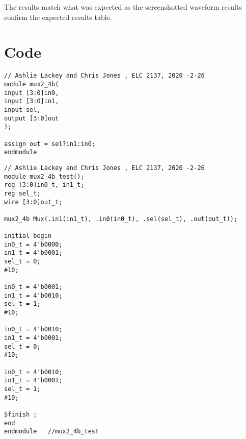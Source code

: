 \documentclass[11pt]{article}
\begin{document}
\clearpage

The results match what was expected as the screenshotted waveform results confirm the expected results table. 


\section*{Code}
\begin{lstlisting}[style=Verilog,caption=mux2-4b Code,label=code:ex ]
// Ashlie Lackey and Chris Jones , ELC 2137, 2020 -2-26
module mux2_4b(
input [3:0]in0,
input [3:0]in1,
input sel,
output [3:0]out
);

assign out = sel?in1:in0;
endmodule
\end{lstlisting}

\begin{lstlisting}[style=Verilog,caption=MUX Testbench Code,label=code:ex ]
// Ashlie Lackey and Chris Jones , ELC 2137, 2020 -2-26
module mux2_4b_test();
reg [3:0]in0_t, in1_t;
reg sel_t;
wire [3:0]out_t;

mux2_4b Mux(.in1(in1_t), .in0(in0_t), .sel(sel_t), .out(out_t));

initial begin
in0_t = 4'b0000;
in1_t = 4'b0001;
sel_t = 0;
#10;

in0_t = 4'b0001;
in1_t = 4'b0010;
sel_t = 1;
#10;

in0_t = 4'b0010;
in1_t = 4'b0001;
sel_t = 0;
#10;

in0_t = 4'b0010;
in1_t = 4'b0001;
sel_t = 1;
#10;

$finish ;
end
endmodule   //mux2_4b_test

\end{lstlisting}
\end{document}
